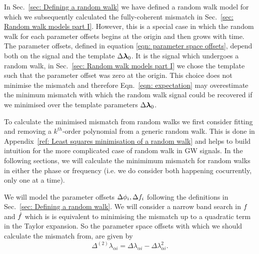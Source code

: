 
In Sec.~\ref{sec: Defining a random walk} we have defined a random walk model
for which we subsequently calculated the fully-coherent mismatch in
Sec.~\ref{sec: Random walk models part I}. However, this is a special case in
which the random walk for each parameter offsets begins at the origin and then
grows with time. The parameter offsets, defined in equation \eqref{eqn:
parameter space offsets}, depend both on the signal and the template
$\Delta \bm{\lambda}_{0}$. It is the signal which undergoes a random walk, in Sec.~\ref{sec:
Random walk models part I} we chose the template such that the parameter offset
was zero at the origin. This choice does not minimise the mismatch and therefore
Eqn.~\eqref{eqn: expectation} may overestimate the minimum mismatch
with which the random walk signal could be recovered if we minimised over the
template parameters $\Delta \bm{\lambda}_0$.

To calculate the minimised mismatch from random walks we first consider
fitting and removing a $k^{th}$-order polynomial from a generic random walk. This
is done in Appendix~\ref{ref: Least squares minimisation of a random walk} and
helps to build intuition for the more complicated case of random walk in
GW signals. In the following sections, we will calculate the minimimum
mismatch for random walks in either the phase or frequency (i.e. we do
consider both happening cocurrently, only one at a time).

We will model the parameter offsets $\Delta\phi_{i}, \Delta f_{i}$
following the definitions in Sec.~\ref{sec: Defining a random walk}.
We will consider a narrow band search in $f$ and $\dot{f}$ which is
is equivalent to minimising the mismatch up to a quadratic term in the Taylor
expansion. So the parameter space offsets with which we should calculate the
mismatch from, are given by
\begin{equation}
\Delta^{(2)}\lambda_{\alpha i} = \Delta\lambda_{\alpha i} - \Delta\lambda_{\alpha i}^{2}.
\end{equation}

